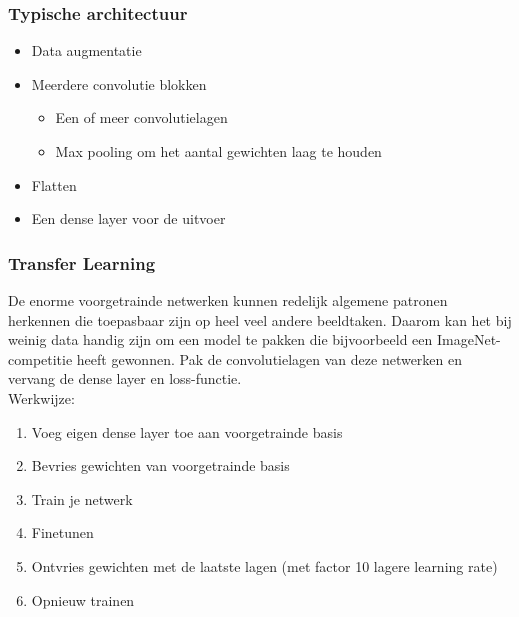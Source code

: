 {\subsubsection{Typische architectuur}
\begin{itemize}
    \item Data augmentatie
    \item Meerdere convolutie blokken
    \begin{itemize}
        \item Een of meer convolutielagen
        \item Max pooling om het aantal gewichten laag te houden
    \end{itemize}
    \item Flatten
    \item Een dense layer voor de uitvoer
\end{itemize}
\subsubsection{Transfer Learning}
De enorme voorgetrainde netwerken kunnen redelijk algemene patronen herkennen die toepasbaar zijn op heel veel andere beeldtaken. Daarom kan het bij weinig data handig zijn om een model te pakken die bijvoorbeeld een ImageNet-competitie heeft gewonnen. Pak de convolutielagen van deze netwerken en vervang de dense layer en loss-functie. \\

Werkwijze:
\begin{enumerate}
    \item Voeg eigen dense layer toe aan voorgetrainde basis
    \item Bevries gewichten van voorgetrainde basis
    \item Train je netwerk
    \item Finetunen
    \item Ontvries gewichten met de laatste lagen (met factor 10 lagere learning rate)
    \item Opnieuw trainen
\end{enumerate}

}
